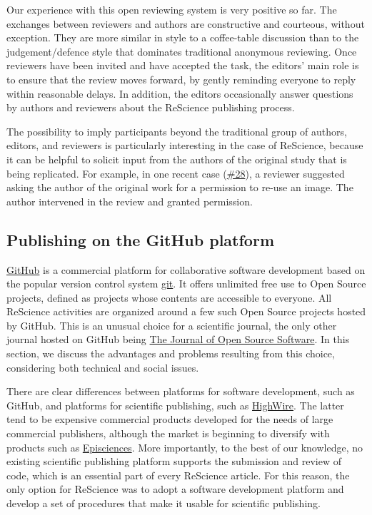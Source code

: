 \documentclass[a4paper,10pt, twocolumn]{article}
\begin{document}
Our experience with this open reviewing system is very positive so
far. The exchanges between reviewers and authors are constructive and
courteous, without exception. They are more similar in style to a
coffee-table discussion than to the judgement/defence style that
dominates traditional anonymous reviewing. Once reviewers have been
invited and have accepted the task, the editors' main role is to
ensure that the review moves forward, by gently reminding everyone to
reply within reasonable delays. In addition, the editors occasionally
answer questions by authors and reviewers about the ReScience
publishing process.

The possibility to imply participants beyond the traditional group of
authors, editors, and reviewers is particularly interesting in the
case of ReScience, because it can be helpful to solicit input from the
authors of the original study that is being replicated. For example,
in one recent case
(\href{https://github.com/ReScience/ReScience-submission/pull/28}{\#28}),
a reviewer suggested asking the author of the original work for a
permission to re-use an image. The author intervened in the review and
granted permission.

\subsection*{Publishing on the GitHub platform}

\href{http://github.com/}{GitHub} is a commercial platform for
collaborative software development based on the popular version
control system \href{https://git-scm.com/}{git}. It offers unlimited
free use to Open Source projects, defined as projects whose contents
are accessible to everyone. All ReScience activities are organized
around a few such Open Source projects hosted by GitHub. This is an
unusual choice for a scientific journal, the only other journal hosted
on GitHub being \href{http://joss.theoj.org/}{The Journal of Open
Source Software}. In this section, we discuss the advantages and
problems resulting from this choice, considering both technical and
social issues.

There are clear differences between platforms for software
development, such as GitHub, and platforms for scientific publishing,
such as \href{http://home.highwire.org/}{HighWire}. The latter tend to
be expensive commercial products developed for the needs of large
commercial publishers, although the market is beginning to diversify
with products such as
\href{https://www.episciences.org/}{Episciences}.  More importantly,
to the best of our knowledge, no existing scientific publishing
platform supports the submission and review of code, which is an
essential part of every ReScience article. For this reason, the only
option for ReScience was to adopt a software development platform and
develop a set of procedures that make it usable for scientific
publishing.
\end{document}
